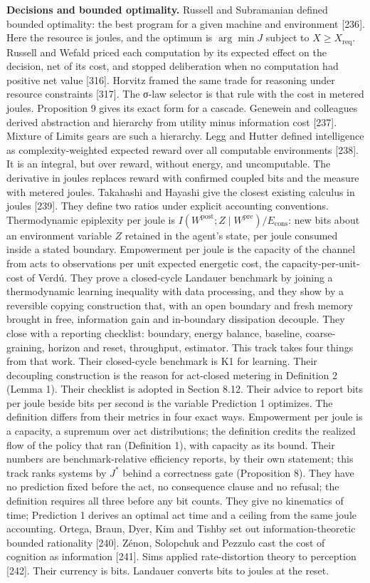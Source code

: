 \documentclass[
  10pt,
]{article}
\begin{document}
\textbf{Decisions and bounded optimality.} Russell and Subramanian
defined bounded optimality: the best program for a given machine and
environment {[}236{]}. Here the resource is joules, and the optimum is
\(\arg\min J\) subject to \(X \ge X_{\mathrm{req}}\). Russell and Wefald
priced each computation by its expected effect on the decision, net of
its cost, and stopped deliberation when no computation had positive net
value {[}316{]}. Horvitz framed the same trade for reasoning under
resource constraints {[}317{]}. The σ-law selector is that rule with the
cost in metered joules. Proposition 9 gives its exact form for a
cascade. Genewein and colleagues derived abstraction and hierarchy from
utility minus information cost {[}237{]}. Mixture of Limits gears are
such a hierarchy. Legg and Hutter defined intelligence as
complexity-weighted expected reward over all computable environments
{[}238{]}. It is an integral, but over reward, without energy, and
uncomputable. The derivative in joules replaces reward with confirmed
coupled bits and the measure with metered joules. Takahashi and Hayashi
give the closest existing calculus in joules {[}239{]}. They define two
ratios under explicit accounting conventions. Thermodynamic epiplexity
per joule is
\(I(W^{\mathrm{post}}; Z \mid W^{\mathrm{pre}})/E_{\mathrm{cons}}\): new
bits about an environment variable \(Z\) retained in the agent's state,
per joule consumed inside a stated boundary. Empowerment per joule is
the capacity of the channel from acts to observations per unit expected
energetic cost, the capacity-per-unit-cost of Verdú. They prove a
closed-cycle Landauer benchmark by joining a thermodynamic learning
inequality with data processing, and they show by a reversible copying
construction that, with an open boundary and fresh memory brought in
free, information gain and in-boundary dissipation decouple. They close
with a reporting checklist: boundary, energy balance, baseline,
coarse-graining, horizon and reset, throughput, estimator. This track
takes four things from that work. Their closed-cycle benchmark is K1 for
learning. Their decoupling construction is the reason for act-closed
metering in Definition 2 (Lemma 1). Their checklist is adopted in
Section 8.12. Their advice to report bits per joule beside bits per
second is the variable Prediction 1 optimizes. The definition differs
from their metrics in four exact ways. Empowerment per joule is a
capacity, a supremum over act distributions; the definition credits the
realized flow of the policy that ran (Definition 1), with capacity as
its bound. Their numbers are benchmark-relative efficiency reports, by
their own statement; this track ranks systems by \(J^*\) behind a
correctness gate (Proposition 8). They have no prediction fixed before
the act, no consequence clause and no refusal; the definition requires
all three before any bit counts. They give no kinematics of time;
Prediction 1 derives an optimal act time and a ceiling from the same
joule accounting. Ortega, Braun, Dyer, Kim and Tishby set out
information-theoretic bounded rationality {[}240{]}. Zénon, Solopchuk
and Pezzulo cast the cost of cognition as information {[}241{]}. Sims
applied rate-distortion theory to perception {[}242{]}. Their currency
is bits. Landauer converts bits to joules at the reset.
\end{document}
